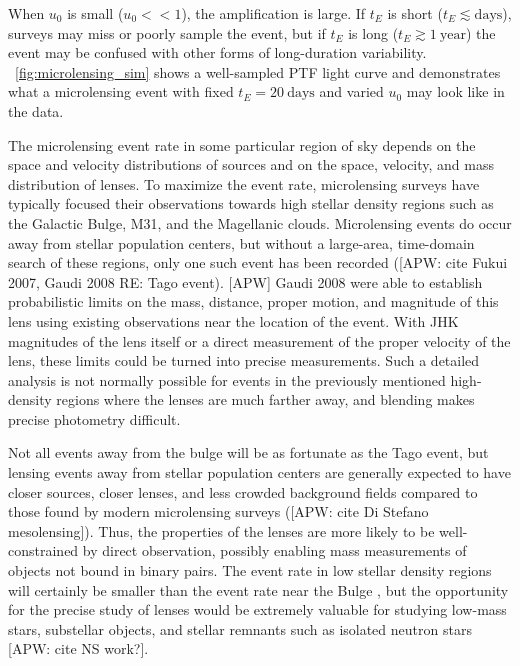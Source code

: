 \documentclass[12pt,preprint]{aastex}
\begin{document}
When $u_0$ is small ($u_0<<1$), the amplification is large. If $t_E$ is short ($t_E \lesssim\mathrm{days}$), surveys may miss or poorly sample the event, but if $t_E$ is long ($t_E \gtrsim 1~\mathrm{year}$) the event may be confused with other forms of long-duration variability. \figurename~\ref{fig:microlensing_sim} shows a well-sampled PTF light curve and demonstrates what a microlensing event with fixed $t_E=20~\mathrm{days}$ and varied $u_0$ may look like in the data.

The microlensing event rate in some particular region of sky depends on the space and velocity distributions of sources and on the space, velocity, and mass distribution of lenses. To maximize the event rate, microlensing surveys have typically focused their observations towards high stellar density regions such as the Galactic Bulge, M31, and the Magellanic clouds. Microlensing events do occur away from stellar population centers, but without a large-area, time-domain search of these regions, only one such event has been recorded ([APW: cite Fukui 2007, Gaudi 2008 RE: Tago event). [APW] Gaudi 2008 were able to establish probabilistic limits on the mass, distance, proper motion, and magnitude of this lens using existing observations near the location of the event. With JHK magnitudes of the lens itself or a direct measurement of the proper velocity of the lens, these limits could be turned into precise measurements. Such a detailed analysis is not normally possible for events in the previously mentioned high-density regions where the lenses are much farther away, and blending makes precise photometry difficult. 

Not all events away from the bulge will be as fortunate as the Tago event, but lensing events away from stellar population centers are generally expected to have closer sources, closer lenses, and less crowded background fields compared to  those found by modern microlensing surveys ([APW: cite Di Stefano mesolensing]). Thus, the properties of the lenses are more likely to be well-constrained by direct observation, possibly enabling mass measurements of objects not bound in binary pairs. The event rate in low stellar density regions will certainly be smaller than the event rate near the Bulge \citep[e.g.,][]{wood_optical_depth, ogle_optical_depth, macho_optical_depth, eros_optical_depth}, but the opportunity for the precise study of lenses would be extremely valuable for studying low-mass stars, substellar objects, and stellar remnants such as isolated neutron stars [APW: cite NS work?]. 
\end{document}

